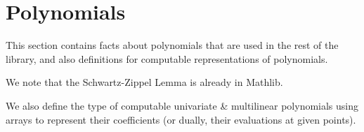 \section{Polynomials}\label{sec:polynomials}

This section contains facts about polynomials that are used in the rest of the library, and also definitions for computable representations of polynomials.

\begin{definition}
    \label{def:multilinear_extension}
\end{definition}

\begin{theorem}
    \label{thm:multilinear_extension_unique}
\end{theorem}

We note that the Schwartz-Zippel Lemma is already in Mathlib.

\begin{theorem}
    \label{thm:schwartz_zippel}
\end{theorem}

We also define the type of computable univariate \& multilinear polynomials using arrays to represent their coefficients (or dually, their evaluations at given points).

\begin{definition}
    \label{def:computable_univariate_polynomials}
\end{definition}

\begin{definition}
    \label{def:computable_multilinear_polynomials}
\end{definition}
